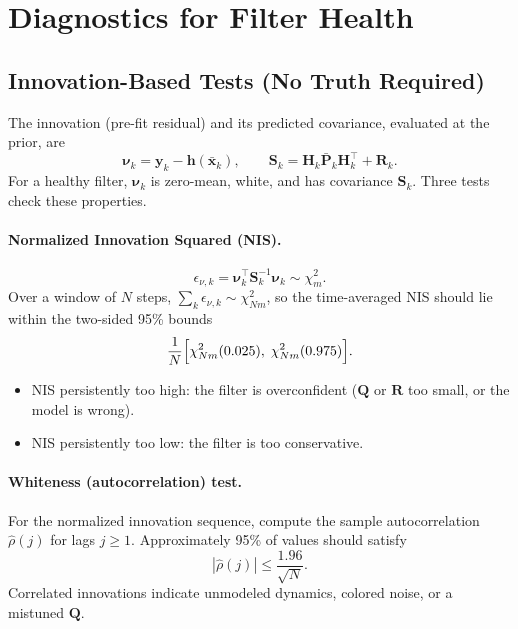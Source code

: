 \documentclass[11pt]{article}
\newcommand{\x}{\bm{x}}
\newcommand{\y}{\bm{y}}
\newcommand{\meas}{\bm{h}}
\newcommand{\Hm}{\bm{H}}
\newcommand{\Pm}{\bm{P}}
\newcommand{\Q}{\bm{Q}}
\newcommand{\R}{\bm{R}}
\newcommand{\Sm}{\bm{S}}
\newcommand{\xbar}{\bar{\x}}
\newcommand{\Pbar}{\bar{\Pm}}
\newcommand{\inn}{\bm{\nu}}
\begin{document}
\section{Diagnostics for Filter Health}

\subsection{Innovation-Based Tests (No Truth Required)}

The innovation (pre-fit residual) and its predicted covariance, evaluated at the prior, are
\begin{equation}
  \inn_k = \y_k - \meas(\xbar_k), \qquad
  \Sm_k = \Hm_k\Pbar_k\Hm_k^\top + \R_k .
\end{equation}
For a healthy filter, $\inn_k$ is zero-mean, white, and has covariance $\Sm_k$. Three tests
check these properties.

\paragraph{Normalized Innovation Squared (NIS).}
\begin{equation}
  \epsilon_{\nu,k} = \inn_k^\top \Sm_k^{-1}\inn_k \sim \chi^2_m .
\end{equation}
Over a window of $N$ steps, $\sum_{k} \epsilon_{\nu,k} \sim \chi^2_{Nm}$, so the time-averaged
NIS should lie within the two-sided 95\% bounds
\begin{equation}
  \frac{1}{N}\Bigl[\chi^2_{Nm}(0.025),\; \chi^2_{Nm}(0.975)\Bigr].
\end{equation}
\begin{itemize}
  \item NIS persistently too high: the filter is overconfident ($\Q$ or $\R$ too small, or the
        model is wrong).
  \item NIS persistently too low: the filter is too conservative.
\end{itemize}

\paragraph{Whiteness (autocorrelation) test.}
For the normalized innovation sequence, compute the sample autocorrelation $\hat\rho(j)$ for
lags $j \ge 1$. Approximately 95\% of values should satisfy
\begin{equation}
  |\hat\rho(j)| \le \frac{1.96}{\sqrt{N}} .
\end{equation}
Correlated innovations indicate unmodeled dynamics, colored noise, or a mistuned $\Q$.
\end{document}
